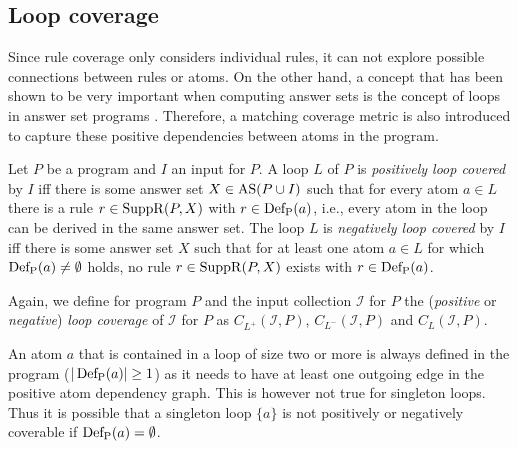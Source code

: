 \subsection{Loop coverage}
\label{subsec:Coverage metrics/Branch-like coverage/Loop coverage}
Since rule coverage only considers individual rules, it can not explore possible connections between rules or atoms. On the other hand, a concept that has been shown to be very important when computing answer sets is the concept of loops in answer set programs \cite{LZ04}. Therefore, a matching coverage metric is also introduced to capture these positive dependencies between atoms in the program.

\begin{definition}
\label{def:loop coverage}
    Let $P$ be a program and $I$ an input for $P$. A loop $L$ of $P$ is \emph{positively loop covered} by $I$ iff there is some answer set \(X \in \operatorname{AS}(P \cup I)\) such that for every atom \(a \in L\) there is a rule \(r \in \operatorname{SuppR}(P, X)\) with \(r \in \operatorname{Def_P}(a)\), i.e., every atom in the loop can be derived in the same answer set.
    The loop $L$ is \emph{negatively loop covered} by $I$ iff there is some answer set $X$ such that for at least one atom \(a \in L\) for which \(\operatorname{Def_P}(a) \neq \emptyset\) holds, no rule \(r \in \operatorname{SuppR}(P, X)\) exists with \(r \in \operatorname{Def_P}(a)\).
\end{definition}

Again, we define for program $P$ and the input collection $\mathcal{I}$ for $P$ the (\emph{positive} or \emph{negative}) \emph{loop coverage} of $\mathcal{I}$ for $P$ as \(C_{L^+}(\mathcal{I}, P)\), \(C_{L^-}(\mathcal{I}, P)\) and \(C_{L}(\mathcal{I}, P)\).

An atom $a$ that is contained in a loop of size two or more is always defined in the program (\(| \operatorname{Def_P}(a) | \geq 1\)) as it needs to have at least one outgoing edge in the positive atom dependency graph. This is however not true for singleton loops. Thus it is possible that a singleton loop \(\{a\}\) is not positively or negatively coverable if \(\operatorname{Def_P}(a) = \emptyset\).

